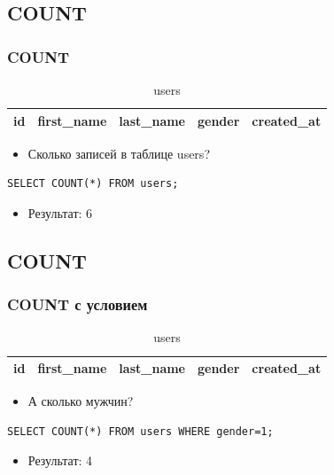 \documentclass[compress,red]{beamer}
\begin{document}
\subsection{COUNT}
\begin{frame}[fragile]
  \frametitle{COUNT}
  \begin{table}
    \begin{tabular}{|c|c|c|c|c|}
      \hline
      id & first\_name & last\_name & gender & created\_at\\
      \hline
    \end{tabular}
    \caption{users}
  \end{table}
  \begin{itemize}
    \item Сколько записей в таблице users?
  \end{itemize}
  \scriptsize{
  \begin{lstlisting}[label=sql2,caption=SELECT COUNT]
    SELECT COUNT(*) FROM users;
  \end{lstlisting}
  \begin{itemize}
    \item Результат: 6
  \end{itemize}
  }
\end{frame}

\subsection{COUNT}
\begin{frame}[fragile]
  \frametitle{COUNT с условием}
  \begin{table}
    \begin{tabular}{|c|c|c|c|c|}
      \hline
      id & first\_name & last\_name & gender & created\_at\\
      \hline
    \end{tabular}
    \caption{users}
  \end{table}
  \begin{itemize}
    \item А сколько мужчин?
  \end{itemize}
  \scriptsize{
  \begin{lstlisting}[label=sql3,caption=SELECT COUNT]
    SELECT COUNT(*) FROM users WHERE gender=1;
  \end{lstlisting}
  \begin{itemize}
    \item Результат: 4
  \end{itemize}
  }
\end{frame}
\end{document}
